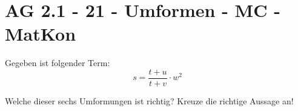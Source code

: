 \section{AG 2.1 - 21 - Umformen - MC - MatKon}

\begin{beispiel}[AG 2.1]{1}
Gegeben ist folgender Term:
				$$s=\frac{t+u}{t+v}\cdot w^2$$
				
				Welche dieser sechs Umformungen ist richtig? Kreuze die richtige Aussage an!
\end{beispiel}